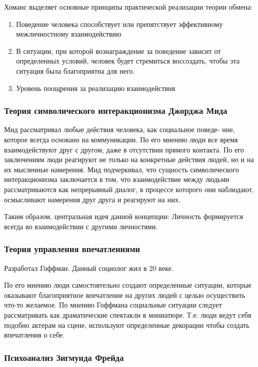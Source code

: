 \documentclass[a4paper,14pt]{extarticle}
\begin{document}
Хоманс выделяет основные принципы практической реализации теории
обмена:

\begin{enumerate}
    \item Поведение человека способствует или препятствует эффективному межличностному взаимодействию
    \item В ситуации, при которой вознаграждение за поведение зависит от определенных условий, человек будет стремиться воссоздать, чтобы эта ситуация была благоприятна для него.
    \item Уровень поощрения за реализацию взаимодействия
\end{enumerate}

\subsubsection{Теория символического интеракционизма Джорджа Мида}

Мид рассматривал любые действия человека, как социальное поведе-
ние, которое всегда основано на коммуникации. По его мнению люди все время взаимодействуют друг с другом, даже в отсутствии прямого контакта. По его заключениям люди реагируют не только на конкретные действия людей, но и на их мысленные намерения. Мид подчеркивал, что сущность символического интеракционизма заключается в том, что взаимодействие между людьми рассматриваются как непрерывный диалог, в процессе которого они наблюдают, осмысливают намерения друг друга и реагируют на них.

Таким образом, центральная идея данной концепции: Личность формируется всегда во взаимодействии с другими личностями.

\subsubsection{Теория управления впечатлениями}

Разработал Гоффман. Данный социолог жил в 20 веке.

По его мнению люди самостоятельно создают определенные ситуации,
которые оказывают благоприятное впечатление на других людей с целью осуществить что-то желаемое. По мнению Гоффмана социальные ситуации следует рассматривать как драматические спектакли в миниатюре. Т.е. люди ведут себя подобно актерам на сцене, используют определенные декорации чтобы создать впечатления о себе.

\subsubsection{Психоанализ Зигмунда Фрейда}
\end{document}
